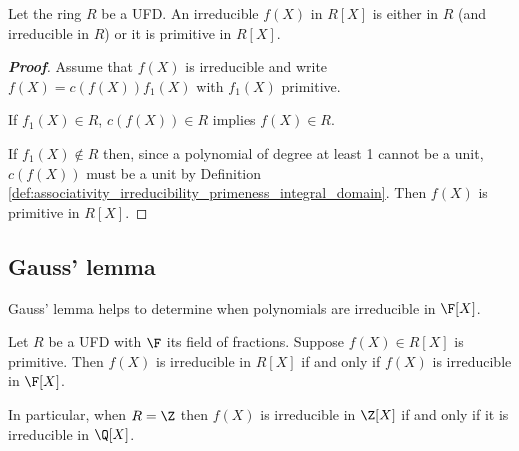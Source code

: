 \begin{proposition}\label{pro:ufd_irreducible_or_primitive}
Let the ring $R$ be a UFD. An irreducible $f(X)$ in $R[X]$ is either in $R$ (and irreducible in $R$) or it is primitive in $R[X]$.
\end{proposition}

\begin{proof}[\bf Proof]
Assume that $f(X)$ is irreducible and write $f(X) = c(f(X))f_1(X)$ with $f_1(X)$ primitive.

If $f_1(X) \in R$, $c(f(X))\in R$ implies $f(X) \in R$.

If $f_1(X) \notin R$ then, since a polynomial of degree at least 1 cannot be a unit, $c(f(X))$ must be a unit by Definition \ref{def:associativity_irreducibility_primeness_integral_domain}. Then $f(X)$ is primitive in $R[X]$.
\end{proof}

\subsection{Gauss' lemma}

Gauss' lemma helps to determine when polynomials are irreducible in $\F[X]$.

\begin{lemma}\label{lem:gauss_polynomial_irreducible}
Let $R$ be a UFD with $\F$ its field of fractions. Suppose $f(X) \in R[X]$ is primitive. Then $f(X)$ is irreducible in $R[X]$ if and only if $f(X)$ is irreducible in $\F[X]$.
\end{lemma}

\begin{remark}
In particular, when $R = \Z$ then $f(X)$ is irreducible in $\Z[X]$ if and only if it is irreducible in $\Q[X]$.
\end{remark}


